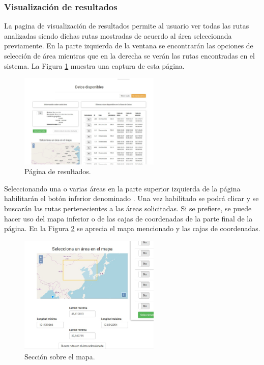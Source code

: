 \subsubsection{Visualización de resultados}
La pagina de visualización de resultados permite al usuario ver todas las rutas analizadas siendo dichas rutas mostradas de acuerdo al área seleccionada previamente. En la parte izquierda de la ventana se encontrarán las opciones de selección de área mientras que en la derecha se verán las rutas encontradas en el sistema. La Figura \ref{resultados} muestra una captura de esta página.

\begin{figure}[h]
  \centering
    \includegraphics[width=0.6\textwidth]{../img/manualusuario/resultados.jpg}
  \caption{Página de resultados.}
  \label{resultados}
\end{figure}

Seleccionando una o varias áreas en la parte superior izquierda de la página habilitarán el botón inferior denominado . Una vez habilitado se podrá clicar y se buscarán las rutas pertenecientes a las áreas solicitadas. Si se prefiere, se puede hacer uso del mapa inferior o de las cajas de coordenadas de la parte final de la página. En la Figura \ref{mapacaja} se aprecia el mapa mencionado y las cajas de coordenadas.

\begin{figure}[h]
  \centering
    \includegraphics[width=0.6\textwidth]{../img/manualusuario/mapaycaja.jpg}
  \caption{Sección sobre el mapa.}
  \label{mapacaja}
\end{figure}

